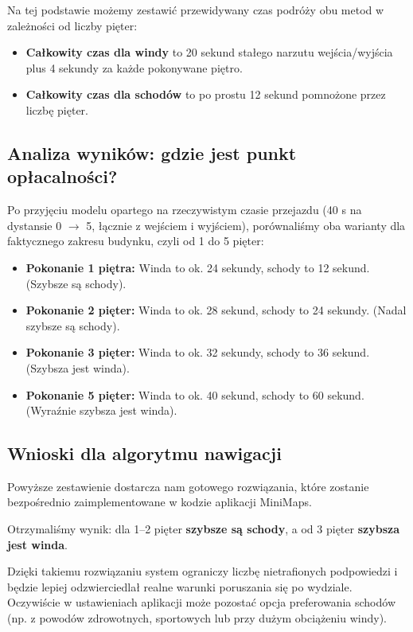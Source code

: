 \documentclass[14pt,a4paper]{extarticle}
\begin{document}
Na tej podstawie możemy zestawić przewidywany czas podróży obu metod w zależności od liczby pięter:
\begin{itemize}
    \item \textbf{Całkowity czas dla windy} to 20 sekund stałego narzutu wejścia/wyjścia plus 4 sekundy za każde pokonywane piętro.
    \item \textbf{Całkowity czas dla schodów} to po prostu 12 sekund pomnożone przez liczbę pięter.
\end{itemize}

\subsection{Analiza wyników: gdzie jest punkt opłacalności?}
Po przyjęciu modelu opartego na rzeczywistym czasie przejazdu (40 s na dystansie 0 $\rightarrow$ 5, łącznie z wejściem i wyjściem), porównaliśmy oba warianty dla faktycznego zakresu budynku, czyli od 1 do 5 pięter:

\begin{itemize}
    \item \textbf{Pokonanie 1 piętra:} Winda to ok. 24 sekundy, schody to 12 sekund. (Szybsze są schody).
    \item \textbf{Pokonanie 2 pięter:} Winda to ok. 28 sekund, schody to 24 sekundy. (Nadal szybsze są schody).
    \item \textbf{Pokonanie 3 pięter:} Winda to ok. 32 sekundy, schody to 36 sekund. (Szybsza jest winda).
    \item \textbf{Pokonanie 5 pięter:} Winda to ok. 40 sekund, schody to 60 sekund. (Wyraźnie szybsza jest winda).
\end{itemize}

\subsection{Wnioski dla algorytmu nawigacji}
Powyższe zestawienie dostarcza nam gotowego rozwiązania, które zostanie bezpośrednio zaimplementowane w kodzie aplikacji MiniMaps.

Otrzymaliśmy wynik: dla 1--2 pięter \textbf{szybsze są schody}, a od 3 pięter \textbf{szybsza jest winda}.

Dzięki takiemu rozwiązaniu system ograniczy liczbę nietrafionych podpowiedzi i będzie lepiej odzwierciedlał realne warunki poruszania się po wydziale. Oczywiście w ustawieniach aplikacji może pozostać opcja preferowania schodów (np. z powodów zdrowotnych, sportowych lub przy dużym obciążeniu windy).
\end{document}
